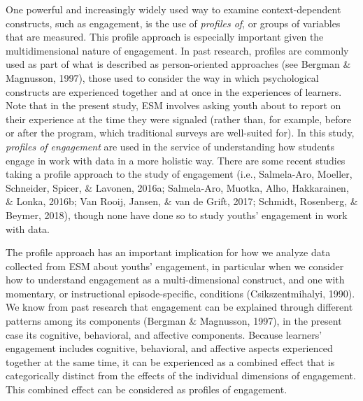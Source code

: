 \documentclass[]{msu-thesis}
\theoremstyle{definition}
\theoremstyle{definition}
\theoremstyle{definition}
\theoremstyle{remark}
\begin{document}
One powerful and increasingly widely used way to examine
context-dependent constructs, such as engagement, is the use of
\emph{profiles of}, or groups of variables that are measured. This
profile approach is especially important given the multidimensional
nature of engagement. In past research, profiles are commonly used as
part of what is described as person-oriented approaches (see Bergman \&
Magnusson, 1997), those used to consider the way in which psychological
constructs are experienced together and at once in the experiences of
learners. Note that in the present study, ESM involves asking youth
about to report on their experience at the time they were signaled
(rather than, for example, before or after the program, which
traditional surveys are well-suited for). In this study, \emph{profiles
of engagement} are used in the service of understanding how students
engage in work with data in a more holistic way. There are some recent
studies taking a profile approach to the study of engagement (i.e.,
Salmela-Aro, Moeller, Schneider, Spicer, \& Lavonen, 2016a; Salmela-Aro,
Muotka, Alho, Hakkarainen, \& Lonka, 2016b; Van Rooij, Jansen, \& van de
Grift, 2017; Schmidt, Rosenberg, \& Beymer, 2018), though none have done
so to study youths' engagement in work with data.

The profile approach has an important implication for how we analyze
data collected from ESM about youths' engagement, in particular when we
consider how to understand engagement as a multi-dimensional construct,
and one with momentary, or instructional episode-specific, conditions
(Csikszentmihalyi, 1990). We know from past research that engagement can
be explained through different patterns among its components (Bergman \&
Magnusson, 1997), in the present case its cognitive, behavioral, and
affective components. Because learners' engagement includes cognitive,
behavioral, and affective aspects experienced together at the same time,
it can be experienced as a combined effect that is categorically
distinct from the effects of the individual dimensions of engagement.
This combined effect can be considered as profiles of engagement.
\end{document}
